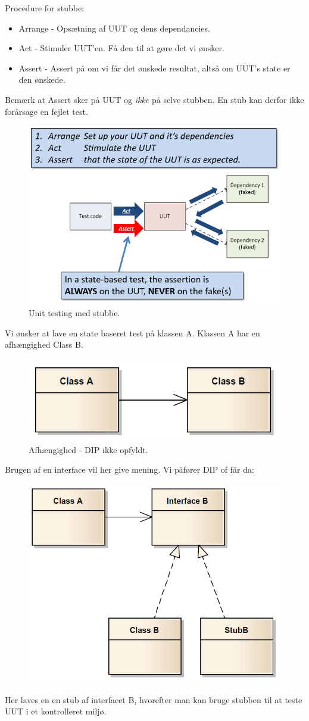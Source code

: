 Procedure for stubbe:
\begin{itemize}
	\item Arrange - Opsætning af UUT og dens dependancies.
	\item Act - Stimuler UUT'en. Få den til at gøre det vi ønsker.
	\item Assert - Assert på om vi får det ønskede resultat, altså om UUT's state er den ønskede.
\end{itemize}

Bemærk at Assert sker på UUT og \textit{ikke} på selve stubben. En stub kan derfor ikke forårsage en fejlet test.

\begin{figure}
\centering
\includegraphics[width=0.7\linewidth]{figs/stubTest.PNG}
\caption{Unit testing med stubbe.}
\label{fig:stubTest}
\end{figure}

Vi ønsker at lave en state baseret test på klassen A. Klassen A har en afhængighed Class B.

\begin{figure}
\centering
\includegraphics[width=0.7\linewidth]{figs/stubNoInterface.PNG}
\caption{Afhængighed - DIP ikke opfyldt.}
\label{fig:stubNoInterface}
\end{figure}

Brugen af en interface vil her give mening. Vi påfører DIP of får da:

\begin{figure}
\centering
\includegraphics[width=0.7\linewidth]{figs/stubInterface.PNG}
\caption{}
\label{fig:stubInterface}
\end{figure}

Her laves en en stub af interfacet B, hvorefter man kan bruge stubben til at teste UUT i et kontrolleret miljø.
\textsl{}